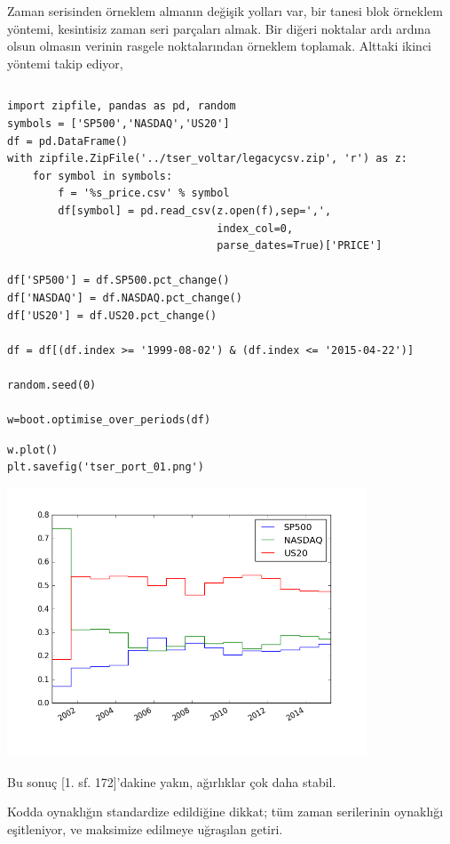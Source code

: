 \documentclass[12pt,fleqn]{article}\usepackage{../../common}
\begin{document}
Zaman serisinden örneklem almanın değişik yolları var, bir tanesi blok örneklem
yöntemi, kesintisiz zaman seri parçaları almak. Bir diğeri noktalar ardı ardına
olsun olmasın verinin rasgele noktalarından örneklem toplamak. Alttaki ikinci
yöntemi takip ediyor,

\inputminted[fontsize=\footnotesize]{python}{boot.py}

\begin{verbatim}
import zipfile, pandas as pd, random
symbols = ['SP500','NASDAQ','US20']
df = pd.DataFrame()
with zipfile.ZipFile('../tser_voltar/legacycsv.zip', 'r') as z:
    for symbol in symbols:
        f = '%s_price.csv' % symbol
        df[symbol] = pd.read_csv(z.open(f),sep=',',
                                 index_col=0,
                                 parse_dates=True)['PRICE']
    
df['SP500'] = df.SP500.pct_change()
df['NASDAQ'] = df.NASDAQ.pct_change()
df['US20'] = df.US20.pct_change()

df = df[(df.index >= '1999-08-02') & (df.index <= '2015-04-22')]
    
random.seed(0)

w=boot.optimise_over_periods(df)
\end{verbatim}


\begin{verbatim}
w.plot()
plt.savefig('tser_port_01.png')
\end{verbatim}

\includegraphics[height=8cm]{tser_port_01.png}

Bu sonuç [1. sf. 172]'dakine yakın, ağırlıklar çok daha stabil.

Kodda oynaklığın standardize edildiğine dikkat; tüm zaman serilerinin oynaklığı
eşitleniyor, ve maksimize edilmeye uğraşılan getiri. 
\end{document}
